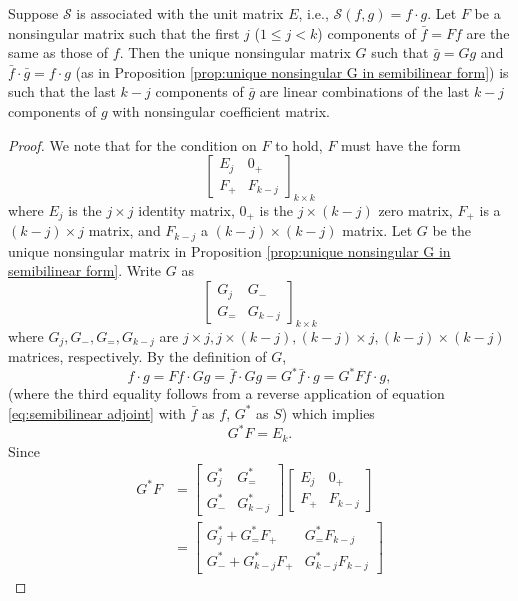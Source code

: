 \documentclass[11pt, oneside, a4paper]{article}
\begin{document}
\begin{prop}\cite[p.287]{CoddingtonLevinson}\label{prop:last k-j components linear combination}
    Suppose $\mathcal{S}$ is associated with the unit matrix $E$, i.e., $\mathcal{S}(f,g)=f\cdot g$. Let $F$ be a nonsingular matrix such that the first $j$ ($1\leq j<k$) components of $\bar{f}=Ff$ are the same as those of $f$. Then the unique nonsingular matrix $G$ such that $\bar{g}=Gg$ and $\bar{f}\cdot \bar{g}=f\cdot g$ (as in Proposition \ref{prop:unique nonsingular G in semibilinear form}) is such that the last $k-j$ components of $\bar{g}$ are linear combinations of the last $k-j$ components of $g$ with nonsingular coefficient matrix.
\end{prop}
\begin{proof}
    We note that for the condition on $F$ to hold, $F$ must have the form
\[\begin{bmatrix}E_j & 0_+\\
F_+ & F_{k-j}\end{bmatrix}_{k\times k}\]
where $E_j$ is the $j\times j$ identity matrix, $0_+$ is the $j\times (k-j)$ zero matrix, $F_+$ is a $(k-j)\times j$ matrix, and $F_{k-j}$ a $(k-j)\times (k-j)$ matrix. Let $G$ be the unique nonsingular matrix in Proposition \ref{prop:unique nonsingular G in semibilinear form}. Write $G$ as
\[\begin{bmatrix}G_j & G_-\\
G_= & G_{k-j}\end{bmatrix}_{k\times k}\]
where $G_j, G_-, G_=, G_{k-j}$ are $j\times j, j\times (k-j), (k-j)\times j, (k-j)\times (k-j)$ matrices, respectively. By the definition of $G$,
\[f\cdot g = Ff\cdot Gg = \bar{f}\cdot Gg = G^*\bar{f}\cdot g = G^*Ff\cdot g,\]
(where the third equality follows from a reverse application of equation \eqref{eq:semibilinear adjoint} with $\bar{f}$ as $f$, $G^*$ as $S$) which implies
\[G^*F = E_k.\]
Since
\begin{align*}
    G^*F &= \begin{bmatrix}
        G^*_j & G^*_=\\
        G^*_- & G^*_{k-j}
    \end{bmatrix}\begin{bmatrix}E_j & 0_+\\
    F_+ & F_{k-j}\end{bmatrix}\\
    &= \begin{bmatrix}
        G^*_j + G^*_= F_+ & G^*_= F_{k-j}\\
        G^*_- + G^*_{k-j} F_+ & G^*_{k-j}F_{k-j}

\end{bmatrix}
\end{align*}
\end{proof}
\end{document}
